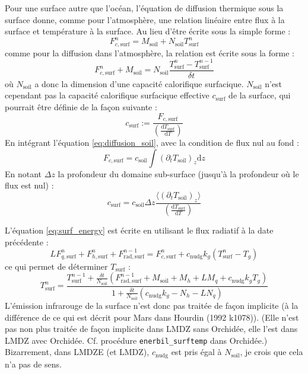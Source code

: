 \documentclass[a4paper,english,french]{article}
\newcommand{\ud}{\mathrm{d}}
\begin{document}
Pour une surface autre que l'océan, l'équation de diffusion thermique
sous la surface donne, comme pour l'atmosphère, une relation linéaire
entre flux à la surface et température à la surface. Au lieu d'être
écrite sous la simple forme :
\begin{equation*}
  F_{c, \mathrm{surf}}^n = M_\mathrm{soil} + N_\mathrm{soil} T_\mathrm{surf}^n
\end{equation*}
comme pour la diffusion dans l'atmosphère, la relation est écrite sous
la forme :
\begin{equation*}
  F_{c, \mathrm{surf}}^n + M_\mathrm{soil}
  = N_\mathrm{soil} \frac{T_\mathrm{surf}^n - T_\mathrm{surf}^{n - 1}}{\delta t}
\end{equation*}
où $N_\mathrm{soil}$ a donc la dimension d'une capacité calorifique
surfacique. $N_\mathrm{soil}$ n'est cependant pas la capacité
calorifique surfacique effective $c_\mathrm{surf}$ de la surface, qui
pourrait être définie de la façon suivante :
\begin{equation*}
  c_\mathrm{surf}
  := \frac{F_{c, \mathrm{surf}}}{\left(\frac{\ud T_\mathrm{surf}}{\ud T} \right)}
\end{equation*}
En intégrant l'équation \ref{eq:diffusion_soil}, avec la condition de
flux nul au fond :
\begin{equation*}
  F_{c, \mathrm{surf}} = c_\mathrm{soil} \int (\partial_t T_\mathrm{soil})_z \ud z
\end{equation*}
En notant $\Delta z$ la profondeur du domaine sub-surface (jusqu'à la
profondeur où le flux est nul) :
\begin{equation*}
  c_\mathrm{surf}
  = c_\mathrm{soil} \Delta z
  \frac
  {\langle (\partial_t T_\mathrm{soil})_z \rangle }
  {\left(\frac{\ud T_\mathrm{surf}}{\ud T} \right)}
\end{equation*}

L'équation \ref{eq:surf_energy} est écrite en utilisant le flux
radiatif à la date précédente :
\begin{equation*}
  L F_{q, \mathrm{surf}}^n + F_{h, \mathrm{surf}}^n + F_{\mathrm{rad,surf}}^{n - 1}
  = F_{c, \mathrm{surf}}^n + c_\mathrm{nudg} k_g (T_\mathrm{surf}^n - T_g)
\end{equation*}
ce qui permet de déterminer $T_\mathrm{surf}$ :
\begin{equation*}
  T_\mathrm{surf}^n
  =
  \frac
  {
    T_\mathrm{surf}^{n - 1}
    + \frac{\delta t}{N_\mathrm{soil}}
    (F_{\mathrm{rad,surf}}^{n - 1} + M_\mathrm{soil} + M_h + L M_q
    + c_\mathrm{nudg} k_g T_g)
  }
  {1 + \frac{\delta t}{N_\mathrm{soil}} (c_\mathrm{nudg} k_g - N_h - L N_q)}
\end{equation*}
L'émission infrarouge de la surface n'est donc pas traitée de façon
implicite (à la différence de ce qui est décrit pour Mars dans Hourdin
(1992 k1078)). (Elle n'est pas non plus traitée de façon implicite
dans LMDZ sans Orchidée, elle l'est dans LMDZ avec
Orchidée. Cf. procédure \verb+enerbil_surftemp+ dans Orchidée.)
Bizarrement, dans LMDZE (et LMDZ), $c_\mathrm{nudg}$ est pris égal à
$N_\mathrm{soil}$, je crois que cela n'a pas de sens.
\end{document}
